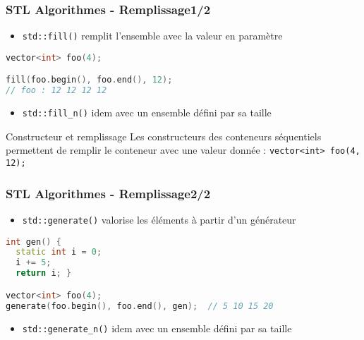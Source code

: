 \documentclass[C++.tex]{subfiles}
\begin{document}
\begin{frame}[fragile]
	\frametitle{STL Algorithmes - Remplissage\titlehfill{}1/2}
	\begin{itemize}
		\item \lstinline|std::fill()| remplit l'ensemble avec la valeur en paramètre
	\end{itemize}

	\begin{lstlisting}[language=C++]
vector<int> foo(4);

fill(foo.begin(), foo.end(), 12);
// foo : 12 12 12 12\end{lstlisting}

	\begin{itemize}
		\item \lstinline|std::fill_n()| idem avec un ensemble défini par sa taille
	\end{itemize}

	\begin{block}{Constructeur et remplissage}
		Les constructeurs des conteneurs séquentiels permettent de remplir le conteneur avec une valeur donnée : \lstinline|vector<int> foo(4, 12);|
	\end{block}
\end{frame}

\begin{frame}[fragile]
	\frametitle{STL Algorithmes - Remplissage\titlehfill{}2/2}
	\begin{itemize}
		\item \lstinline|std::generate()| valorise les éléments à partir d'un générateur
	\end{itemize}

	\begin{lstlisting}[language=C++]
int gen() {
  static int i = 0;
  i += 5;
  return i; }

vector<int> foo(4);
generate(foo.begin(), foo.end(), gen);  // 5 10 15 20\end{lstlisting}

	\begin{itemize}
		\item \lstinline|std::generate_n()| idem avec un ensemble défini par sa taille
	\end{itemize}
\end{frame}
\end{document}
